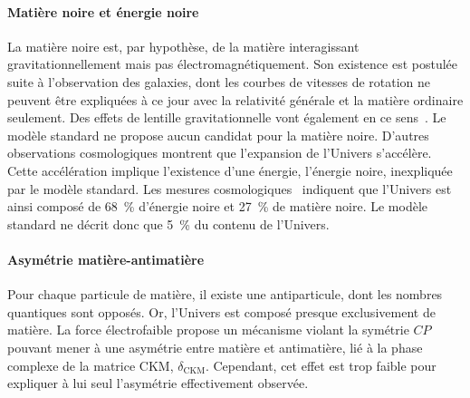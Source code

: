 \paragraph{Matière noire et énergie noire}
La matière noire est, par hypothèse, de la matière interagissant gravitationnellement mais pas électromagnétiquement.
Son existence est postulée suite à l'observation des galaxies, dont les courbes de vitesses de rotation ne peuvent être expliquées à ce jour avec la relativité générale et la matière ordinaire seulement. Des effets de lentille gravitationnelle vont également en ce sens~\cite{Clowe_2006}.
Le modèle standard ne propose aucun candidat pour la matière noire.
D'autres observations cosmologiques montrent que l'expansion de l'Univers s'accélère. Cette accélération implique l'existence d'une énergie, l'énergie noire, inexpliquée par le modèle standard.
Les mesures cosmologiques~\cite{planck_2013} indiquent que l'Univers est ainsi composé de \SI{68}{\%} d'énergie noire et \SI{27}{\%} de matière noire. Le modèle standard ne décrit donc que \SI{5}{\%} du contenu de l'Univers.
\paragraph{Asymétrie matière-antimatière}
Pour chaque particule de matière, il existe une antiparticule, dont les nombres quantiques sont opposés.
Or, l'Univers est composé presque exclusivement de matière.
La force électrofaible propose un mécanisme violant la symétrie $CP$ pouvant mener à une asymétrie entre matière et antimatière, lié à la phase complexe de la matrice CKM, $\delta_{\text{CKM}}$.
Cependant, cet effet est trop faible pour expliquer à lui seul l'asymétrie effectivement observée.

